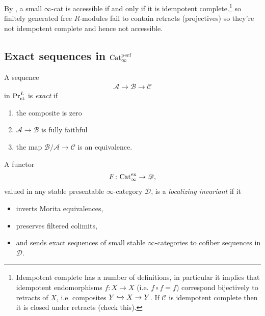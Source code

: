 \begin{remark} By \cite[5.4.3.6]{HTT}, a small $\infty$-cat is accessible if and only if it is idempotent complete.\footnote{Idempotent complete has a number of definitions, in particular it implies that idempotent endomorphisms $f \colon X \to X$ (i.e. $f\circ f = f$) correspond bijectively to retracts of $X$, i.e. composites $Y \xhookrightarrow{} X \to Y$. If $\mathscr{C}$ is idempotent complete then it is closed under retracts (\todo check this).} so finitely generated free $R$-modules fail to contain retracts (projectives) so they're not idempotent complete and hence not accessible.
\end{remark}

\subsection{Exact sequences in $\mathrm{Cat}_\infty^{\mathrm{perf}}$}

\begin{definition}\label{def:exact-sequence-PrLst}
\cite[5.8]{BGT} A sequence
\begin{align*}
    \mathcal{A} \to \mathcal{B} \to \mathcal{C}
\end{align*}
in $\mathrm{Pr}^L_{\mathrm{st}}$ is \textit{exact} if
\begin{enumerate}
    \item the composite is zero
    \item $\mathcal{A} \to \mathcal{B}$ is fully faithful
    \item the map $\mathcal{B}/\mathcal{A} \to \mathcal{C}$ is an equivalence.
\end{enumerate}
\end{definition}

\begin{definition} A functor
\begin{align*}
    F \colon \mathrm{Cat}_\infty^{\mathrm{ex}} \to \mathscr{D},
\end{align*}
valued in any stable presentable $\infty$-category $\mathscr{D}$, is a \textit{localizing invariant} if it
\begin{itemize}
    \item inverts Morita equivalences,
    \item preserves filtered colimits,
    \item and sends exact sequences of small stable $\infty$-categories to cofiber sequences in $\mathscr{D}$.
\end{itemize}
\end{definition}



